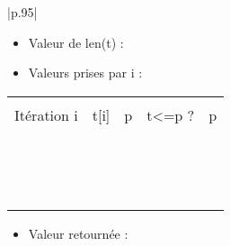 \documentclass[10pt]{article}
\begin{document}
\begin{center}
\begin{tabular}{|p{.95\linewidth}|}
\hline
\begin{itemize}
\item Valeur de \textsf{len(t)} : \dotfill
\vspace{1cm}
\item Valeurs prises par \textsf{i} : \dotfill
\end{itemize} 
\begin{center}
\begin{tabular}{|p{2cm}|p{2cm}|p{2cm}|p{2cm}|p{2cm}|}
\hline 
& & & & \\
Itération \textsf{i} & \textsf{t[i]} & \textsf{p} & \textsf{t<=p} ? & p \\
& & & & \\
\hline
& & & & \\
& & & & \\
\hline
& & & & \\
& & & & \\
\hline
& & & & \\
& & & & \\
\hline
& & & & \\
& & & & \\
\hline
& & & & \\
& & & & \\
\hline
& & & & \\
& & & & \\
\hline
& & & & \\
& & & & \\
\hline
\end{tabular}
\end{center}
\begin{itemize}
\item Valeur retournée : \dotfill
\end{itemize} 
\\
\hline
\end{tabular}
\end{center}

\newpage
\fi



\subparagraph{}
\textit{}%
\end{document}
